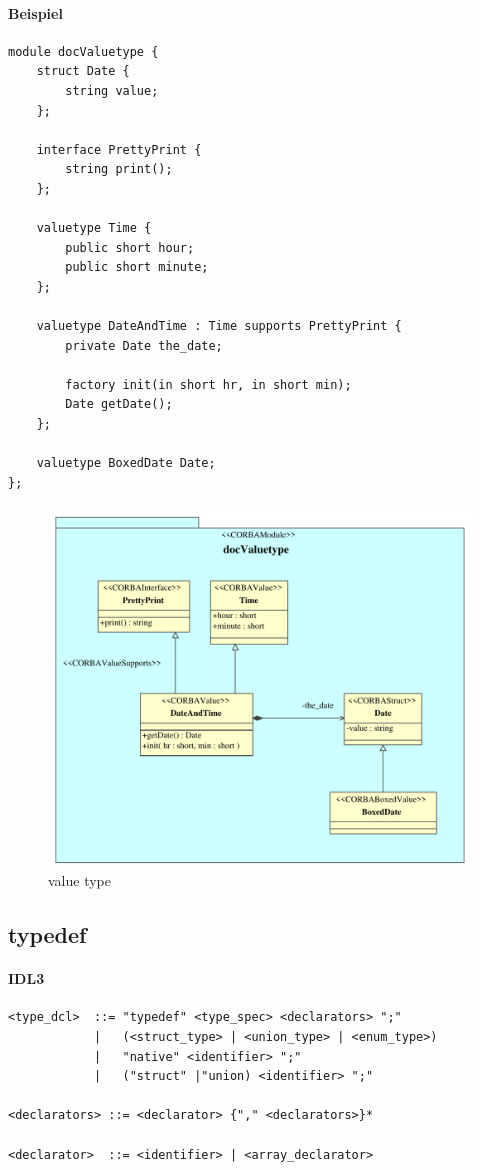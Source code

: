 \documentclass [a4paper,10pt] {scrartcl}
\begin{document}
\paragraph{Beispiel}
\begin{verbatim}
module docValuetype {
    struct Date {
        string value;
    };

    interface PrettyPrint {
        string print();
    };

    valuetype Time {
        public short hour;
        public short minute;
    };

    valuetype DateAndTime : Time supports PrettyPrint {
        private Date the_date;

        factory init(in short hr, in short min);
        Date getDate();
    };

    valuetype BoxedDate Date;
};
\end{verbatim}
\begin{figure}[!h]
\centerline{\includegraphics[width=\linewidth]{docValuetype}}
\caption{value type}
\label{fig:valuetype}
\end{figure}

\cleardoublepage
\subsection{typedef}
\paragraph{IDL3}
\begin{verbatim}
<type_dcl>  ::= "typedef" <type_spec> <declarators> ";"
            |   (<struct_type> | <union_type> | <enum_type>)
            |   "native" <identifier> ";"
            |   ("struct" |"union) <identifier> ";"

<declarators> ::= <declarator> {"," <declarators>}*

<declarator>  ::= <identifier> | <array_declarator>
\end{verbatim}
\end{document}
